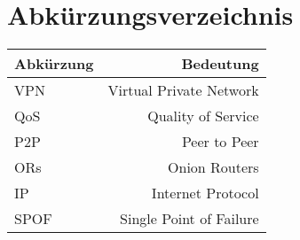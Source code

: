 \section{Abkürzungsverzeichnis}

\begin{tabular}{l|r}
    Abkürzung & Bedeutung \\
    \hline
    VPN & Virtual Private Network \\
    QoS & Quality of Service \\
    P2P & Peer to Peer \\
    ORs & Onion Routers \\
    IP & Internet Protocol \\
    SPOF & Single Point of Failure \\
\end{tabular}